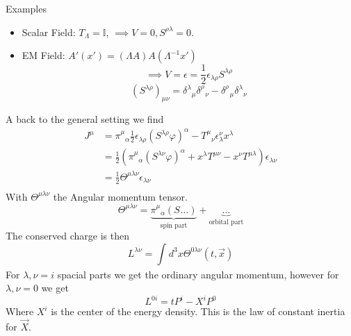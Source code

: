 \documentclass{report}
\begin{document}
\begin{description}
Examples
\begin{itemize}
  \item Scalar Field: $T_{\Lambda} = \mathbb{I}$, $\implies V = 0, S^{\rho \lambda} = 0$. 
  \item EM Field: $A'\left( x' \right) = \left( \Lambda A \right)  A\left( \Lambda^{-1} x' \right) $ \[
  \implies V = \epsilon = \frac{1}{2}  \epsilon_{\lambda \rho} S^{\lambda \rho} 
  \] \[
  \left( S^{\lambda \rho}  \right)_{\mu \nu}  = \delta^{\lambda}_{\text{ }\mu} \delta^{\rho}_{\text{ }\nu} - \delta^{\rho}_{\text{ }\mu} \delta^{\lambda}_{\text{ }\nu} 
  \] 
\end{itemize}
  A back to the general setting we find
  \begin{align*}
    J^{\mu} &= \pi^{\mu}_{\text{ }\alpha} \frac{1}{2} \epsilon_{\lambda\rho} \left( S^{\lambda \rho} \varphi \right)^{\alpha}  - T^{\mu}_{\text{ }\nu} \epsilon^{\nu}_{\lambda} x^{\lambda} \\
            &= \frac{1}{2} \left( \pi^{\mu}_{\text{ }\alpha} \left( S^{\lambda \nu} \varphi \right) ^{\alpha} + x^{\lambda} T^{\mu\nu} - x^{\nu} T^{\mu \lambda}   \right) \epsilon_{\lambda \nu}  \\
            &= \frac{1}{2} \Theta^{\mu\lambda \nu} \epsilon_{\lambda \nu}  \\
  \end{align*}
  With $\Theta^{\mu \lambda \nu} $ the Angular momentum tensor.\[
  \Theta^{\mu \lambda \nu} = \underbrace{\pi^{\mu}_{\text{ }\alpha} \left( S^{} \ldots \right)  }_{\text{spin part}} + \underbrace{\ldots}_{\text{orbital part}} 
  \] The conserved charge is then \[
  L^{\lambda \nu} = \int_{ }^{} d^3 x \Theta^{0 \lambda \nu} ( t, \vec{x} ) 
  \] For $\lambda, \nu = i$ spacial parts we get the ordinary angular momentum, however for $\lambda, \nu = 0$ we get \[
  L^{0i}  = t P^{i} - X^{i} P^{0} 
  \] Where $X^{i} $ is the center of the energy density. This is the law of constant inertia for $\vec{X}$.
\end{description}
\end{document}
